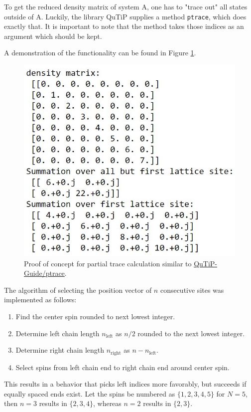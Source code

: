 \documentclass[reprint,amsmath,amssymb,aps,prb]{revtex4-2}
\begin{document}
To get the reduced density matrix of system A, one has to "trace out" all states outside of A. Luckily, the library QuTiP supplies a method \texttt{ptrace}, which does exactly that. It is important to note that the method takes those indices as an argument which should be kept.\cite{Johansson2012}

A demonstration of the functionality can be found in Figure \ref{fig:partialtrace_proof_of_concept}.

\begin{figure}[h!]
\centering
\includegraphics[width=0.7\linewidth]{figures/partialtrace_proof_of_concept}
\caption{Proof of concept for partial trace calculation similar to \protect\hyperlink{http://qutip.org/docs/3.1.0/guide/guide-tensor.html}{QuTiP-Guide/ptrace}.}
\label{fig:partialtrace_proof_of_concept}
\end{figure}

The algorithm of selecting the position vector of $n$ consecutive sites was implemented as follows: 
\begin{enumerate}
	\item Find the center spin rounded to next lowest integer.
	\item Determine left chain length $n_\text{left}$ as $n/2$ rounded to the next lowest integer.
	\item Determine right chain length $n_\text{right}$ as $n-n_\text{left}$.
	\item Select spins from left chain end to right chain end around center spin.
\end{enumerate}
This results in a behavior that picks left indices more favorably, but succeeds if equally spaced ends exist. Let the spins be numbered as $\{1, 2, 3, 4, 5\}$ for $N=5$, then  $n=3$ results in $\{2, 3, 4\}$, whereas $n=2$ results in $\{2, 3\}$.
\end{document}
